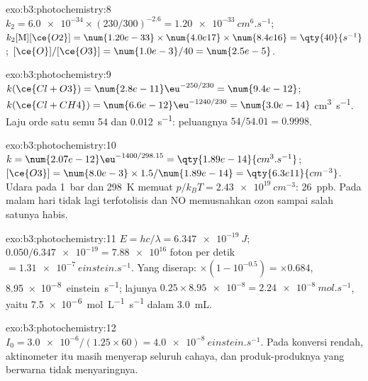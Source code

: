 \begin{solution}{exo:b3:photochemistry:8}
$k_2 = \num{6.0e-34} \times (230/300)^{-2.6} = \qty{1.20e-33}{cm^6.s^{-1}}$; $k_2[\mathrm M][\ce{O2}] = \num{1.20e-33} \times
\num{4.0e17} \times \num{8.4e16} = \qty{40}{s^{-1}}$; $[\ce{O}]/[\ce{O3}] = \num{1.0e-3}/40 = \num{2.5e-5}$.
\end{solution}

\begin{solution}{exo:b3:photochemistry:9}
$k(\ce{Cl + O3}) = \num{2.8e-11}\eu^{-250/230} = \num{9.4e-12}$; $k(\ce{Cl + CH4}) = \num{6.6e-12}\eu^{-1240/230} = \num{3.0e-14}$
\unit{cm^3.s^{-1}}. Laju orde satu semu 54 dan \qty{0.012}{s^{-1}}: peluangnya $54/54.01 = 0.9998$.
\end{solution}

\begin{solution}{exo:b3:photochemistry:10}
$k = \num{2.07e-12}\eu^{-1400/298.15} = \qty{1.89e-14}{cm^3.s^{-1}}$; $[\ce{O3}] = \num{8.0e-3} \times 1.5/\num{1.89e-14} =
\qty{6.3e11}{cm^{-3}}$. Udara pada \qty{1}{bar} dan \qty{298}{K} memuat
$p/k_BT = \qty{2.43e19}{cm^{-3}}$: \qty{26}{ppb}. Pada malam hari  tidak lagi
terfotolisis dan NO memusnahkan ozon sampai salah satunya habis.
\end{solution}

\begin{solution}{exo:b3:photochemistry:11}
$E = hc/\lambda = \qty{6.347e-19}{J}$; $0.050/\num{6.347e-19} = \num{7.88e16}$ foton per detik
$= \qty{1.31e-7}{einstein.s^{-1}}$.
Yang diserap: $\times(1 - 10^{-0.5}) = \times0.684$, \qty{8.95e-8}{einstein.s^{-1}};
lajunya $0.25 \times \num{8.95e-8} =
\qty{2.24e-8}{mol.s^{-1}}$, yaitu \qty{7.5e-6}{mol.L^{-1}.s^{-1}} dalam \qty{3.0}{mL}.
\end{solution}

\begin{solution}{exo:b3:photochemistry:12}
$I_0 = \num{3.0e-6}/(1.25 \times 60) = \qty{4.0e-8}{einstein.s^{-1}}$. Pada konversi rendah,
aktinometer itu masih menyerap seluruh cahaya, dan produk-produknya yang
berwarna tidak menyaringnya.
\end{solution}

